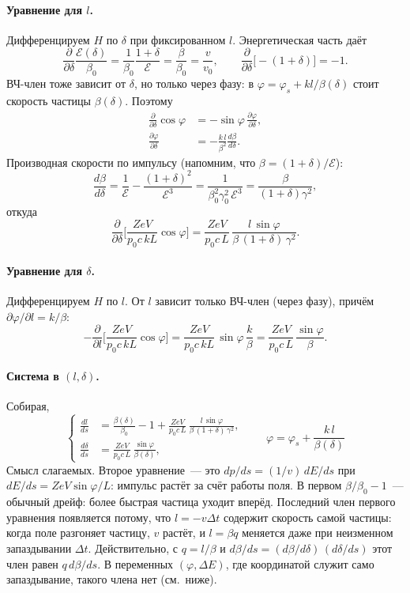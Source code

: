 \documentclass[a4paper,11pt]{article}
\numberwithin{equation}{section}
\newcommand{\cE}{\mathcal{E}}
\begin{document}
\paragraph{Уравнение для $l$.} Дифференцируем $H$ по $\delta$ при фиксированном $l$. Энергетическая часть даёт
\[
\frac{\partial}{\partial\delta}\frac{\cE(\delta)}{\beta_0}=\frac{1}{\beta_0}\frac{1+\delta}{\cE}=\frac{\beta}{\beta_0}=\frac{v}{v_0},
\qquad \frac{\partial}{\partial\delta}\big[-(1+\delta)\big]=-1 .
\]
ВЧ-член тоже зависит от $\delta$, но только через фазу: в $\varphi=\varphi_s+kl/\beta(\delta)$ стоит скорость частицы
$\beta(\delta)$. Поэтому
\[
\begin{aligned}
\frac{\partial}{\partial\delta}\cos\varphi&=-\sin\varphi\,\frac{\partial\varphi}{\partial\delta},\\
\frac{\partial\varphi}{\partial\delta}&=-\frac{k\,l}{\beta^2}\frac{d\beta}{d\delta}.
\end{aligned}
\]
Производная скорости по импульсу (напомним, что $\beta=(1+\delta)/\cE$):
\[
\frac{d\beta}{d\delta}=\frac{1}{\cE}-\frac{(1+\delta)^2}{\cE^3}=\frac{1}{\beta_0^2\gamma_0^2\,\cE^3}=\frac{\beta}{(1+\delta)\gamma^2},
\]
откуда
\[
\frac{\partial}{\partial\delta}\Big[\frac{ZeV}{p_0c\,kL}\cos\varphi\Big]=\frac{ZeV}{p_0c\,L}\,\frac{l\,\sin\varphi}{\beta\,(1+\delta)\,\gamma^2}.
\]

\paragraph{Уравнение для $\delta$.} Дифференцируем $H$ по $l$. От $l$ зависит только ВЧ-член (через фазу),
причём $\partial\varphi/\partial l=k/\beta$:
\[
-\frac{\partial}{\partial l}\Big[\frac{ZeV}{p_0c\,kL}\cos\varphi\Big]=\frac{ZeV}{p_0c\,kL}\,\sin\varphi\,\frac{k}{\beta}=\frac{ZeV}{p_0c\,L}\,\frac{\sin\varphi}{\beta}.
\]

\paragraph{Система в $(l,\delta)$.} Собирая,
\begin{equation}
\boxed{\ \left\{\begin{aligned}
\frac{dl}{ds}&=\frac{\beta(\delta)}{\beta_0}-1+\frac{ZeV}{p_0c\,L}\,\frac{l\,\sin\varphi}{\beta\,(1+\delta)\,\gamma^2},\\[2pt]
\frac{d\delta}{ds}&=\frac{ZeV}{p_0c\,L}\,\frac{\sin\varphi}{\beta(\delta)},
\end{aligned}\right.\qquad \varphi=\varphi_s+\frac{k\,l}{\beta(\delta)}\ } \label{eq:eomld}
\end{equation}
Смысл слагаемых. Второе уравнение~--- это $dp/ds=(1/v)\,dE/ds$ при $dE/ds=ZeV\sin\varphi/L$: импульс растёт
за счёт работы поля. В первом $\beta/\beta_0-1$~--- обычный дрейф: более быстрая частица уходит вперёд.
Последний член первого уравнения появляется потому, что $l=-v\Delta t$ содержит скорость самой частицы: когда
поле разгоняет частицу, $v$ растёт, и $l=\beta q$ меняется даже при неизменном запаздывании $\Delta t$. Действительно,
с $q=l/\beta$ и $d\beta/ds=(d\beta/d\delta)\,(d\delta/ds)$ этот член равен $q\,d\beta/ds$. В переменных
$(\varphi,\Delta E)$, где координатой служит само запаздывание, такого члена нет (см.\ ниже).
\end{document}
